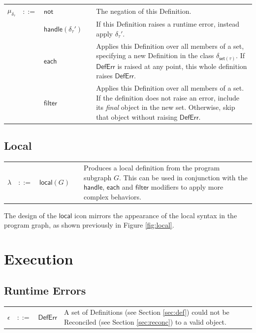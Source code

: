 \documentclass[twoside,openright,11pt]{report}
\begin{document}
\noindent\begin{tabularx}{\textwidth}{p{0.5cm} p{0.5cm} p{5cm} c X}
$\mu_{\delta_\tau}$ & $::=$ & $\mathsf{not}$ &  & The negation of this Definition. \\
 & & $\mathsf{handle}(\delta_\tau')$ &  & If this Definition raises a runtime error, instead apply $\delta_\tau'$. \\
 & & $\mathsf{each}$ &  & Applies this Definition over all members of a set, specifying a new Definition in the class $\delta_{\mathsf{set}(\tau)}$. If $\mathsf{DefErr}$ is raised at any point, this whole definition raises $\mathsf{DefErr}$. \\
 & & $\mathsf{filter}$ &  & Applies this Definition over all members of a set. If the definition does not raise an error, include its {\it final} object in the new set. Otherwise, skip that object without raising $\mathsf{DefErr}$. \\
\end{tabularx}

\section{Local}
\label{sec:local}

\noindent\begin{tabularx}{\textwidth}{p{0.5cm} p{0.5cm} p{5cm} c X}
$\lambda$ & $::=$ & $\mathsf{local}(G)$ &  & Produces a local definition from the program subgraph $G$. This can be used in conjunction with the $\mathsf{handle}$, $\mathsf{each}$ and $\mathsf{filter}$ modifiers to apply more complex behaviors.\\
\end{tabularx}

The design of the $\mathsf{local}$ icon mirrors the appearance of the local syntax in the program graph, as shown previously in Figure \ref{fig:local}.


\chapter{Execution}
\label{chap:exec}

\section{Runtime Errors}
\label{sec:runtime-errors}

\begin{tabularx}{\textwidth}{l l l X}
$\epsilon$ & $::=$ & $\mathsf{DefErr}$ & A set of Definitions (see Section \ref{sec:def}) could not be Reconciled (see Section \ref{sec:reconc}) to a valid object.
\end{tabularx}
\end{document}
